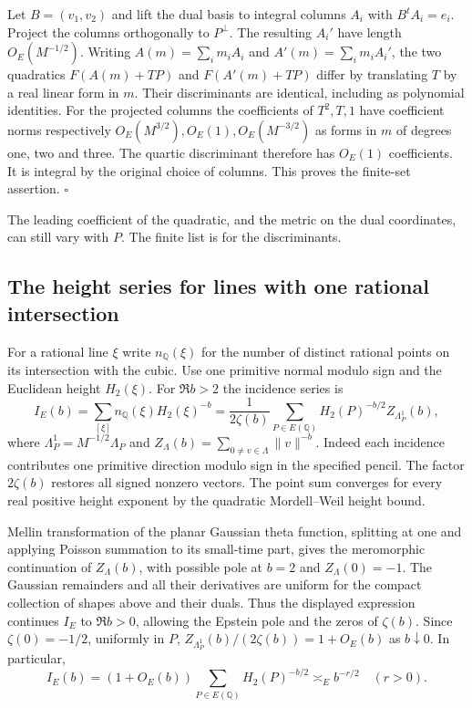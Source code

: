 \documentclass[11pt]{article}
\begin{document}
Let $B=(v_1,v_2)$ and lift the dual basis to integral columns $A_i$
with $B^t A_i=e_i$. Project the columns orthogonally to $P^\perp$.
The resulting $A_i'$ have length $O_E(M^{-1/2})$. Writing
$A(m)=\sum_i m_i A_i$ and $A'(m)=\sum_i m_i A_i'$, the two
quadratics $F(A(m)+TP)$ and $F(A'(m)+TP)$ differ by translating $T$
by a real linear form in $m$. Their discriminants are identical,
including as polynomial identities. For the projected columns the
coefficients of $T^2,T,1$ have coefficient norms respectively
$O_E(M^{3/2}),O_E(1),O_E(M^{-3/2})$ as forms in $m$ of degrees
one, two and three. The quartic discriminant therefore has
$O_E(1)$ coefficients. It is integral by the original choice of
columns. This proves the finite-set assertion. \hfill$\square$

The leading coefficient of the quadratic, and the metric on the
dual coordinates, can still vary with $P$. The finite list is for
the discriminants.

\subsection{The height series for lines with one rational intersection}
For a rational line $\xi$ write $n_{\mathbb Q}(\xi)$ for the number
of distinct rational points on its intersection with the cubic. Use
one primitive normal modulo sign and the Euclidean height $H_2(\xi)$.
For $\Re b>2$ the incidence series is
\[
 I_E(b)=\sum_{[\xi]}n_{\mathbb Q}(\xi)H_2(\xi)^{-b}
   =\frac{1}{2\zeta(b)}\sum_{P\in E(\mathbb Q)}
         H_2(P)^{-b/2} Z_{\Lambda_P^1}(b),
\]
where $\Lambda_P^1=M^{-1/2}\Lambda_P$ and
$Z_\Lambda(b)=\sum_{0\ne v\in\Lambda}\|v\|^{-b}$.
Indeed each incidence contributes one primitive direction modulo sign
in the specified pencil. The factor $2\zeta(b)$ restores all signed
nonzero vectors. The point sum converges for every real positive height
exponent by the quadratic Mordell--Weil height bound.

Mellin transformation of the planar Gaussian theta function, splitting
at one and applying Poisson summation to its small-time part, gives
the meromorphic continuation of $Z_\Lambda(b)$, with possible pole at
$b=2$ and $Z_\Lambda(0)=-1$. The Gaussian remainders and all their
derivatives are uniform for the compact collection of shapes above
and their duals. Thus the displayed expression continues $I_E$ to
$\Re b>0$, allowing the Epstein pole and the zeros of $\zeta(b)$.
Since $\zeta(0)=-1/2$, uniformly in $P$,
$Z_{\Lambda_P^1}(b)/(2\zeta(b))=1+O_E(b)$ as $b\downarrow0$.
In particular,
\[
 I_E(b)=(1+O_E(b))\sum_{P\in E(\mathbb Q)}H_2(P)^{-b/2}
                \asymp_E b^{-r/2}\quad(r>0).
\]
\end{document}
